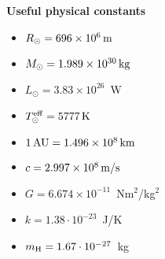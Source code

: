 \documentclass[12pt]{article}
\begin{document}
{\bf Useful physical constants}
\begin{itemize}
  \item $R_{\odot} = 696 \times 10^6\,{\rm m}$
  \item $M_{\odot} = 1.989 \times 10^{30}\,{\rm kg}$
  \item $L_{\odot} = 3.83 \times 10^{26}$~W
  \item $T^{\rm eff}_{\odot} = 5777\,{\rm K}$
  \item $1\,{\rm AU} = 1.496 \times 10^8\,{\rm km}$
  \item $c = 2.997 \times 10^8\,{\rm m/s}$
  \item $G = 6.674 \times 10^{-11}$~Nm$^2$/kg$^2$
  \item $k = 1.38\cdot10^{-23}$~J/K
  \item $m_{\rm H} = 1.67\cdot10^{-27}$~kg
\end{itemize}
\end{document}
